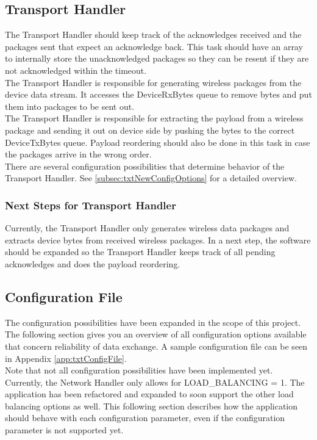 \subsection{Transport Handler}
The Transport Handler should keep track of the acknowledges received and the packages sent that expect an acknowledge back. This task should have an array to internally store the unacknowledged packages so they can be resent if they are not acknowledged within the timeout.\\
The Transport Handler is responsible for generating wireless packages from the device data stream. It accesses the DeviceRxBytes queue to remove bytes and put them into packages to be sent out.\\
The Transport Handler is responsible for extracting the payload from a wireless package and sending it out on device side by pushing the bytes to the correct DeviceTxBytes queue. Payload reordering should also be done in this task in case the packages arrive in the wrong order.\\
There are several configuration possibilities that determine behavior of the Transport Handler. See \autoref{subsec:txtNewConfigOptions} for a detailed overview.
\subsubsection{Next Steps for Transport Handler}
Currently, the Transport Handler only generates wireless data packages and extracts device bytes from received wireless packages. In a next step, the software should be expanded so the Transport Handler keeps track of all pending acknowledges and does the payload reordering.
%
\subsection{Configuration File} \label{subsec:txtNewConfigOptions}
The configuration possibilities have been expanded in the scope of this project. The following section gives you an overview of all configuration options available that concern reliability of data exchange. A sample configuration file can be seen in Appendix \autoref{app:txtConfigFile}.\\
Note that not all configuration possibilities have been implemented yet. Currently, the Network Handler only allows for LOAD\_BALANCING = 1. The application has been refactored and expanded to soon support the other load balancing options as well. This following section describes how the application should behave with each configuration parameter, even if the configuration parameter is not supported yet.
%

